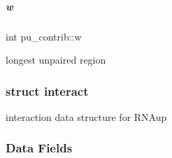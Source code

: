 \mbox{\label{group__data__structures_a403c1c7f20beeeffba7632fac0cfcbff}} 
\subparagraph{\texorpdfstring{w}{w}}
{\footnotesize\ttfamily int pu\+\_\+contrib\+::w}



longest unpaired region 

\label{structinteract}
\subsubsection{struct interact}
interaction data structure for R\+N\+Aup \subsubsection*{Data Fields}
